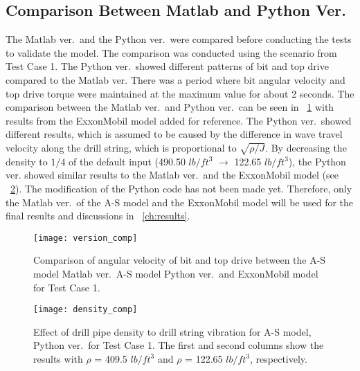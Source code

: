 \subsection{Comparison Between Matlab and Python Ver.}
The Matlab ver.\ and the Python ver.\ were compared before conducting the tests to validate the model. The comparison was conducted using the scenario from Test Case 1. The Python ver.\ showed different patterns of bit and top drive compared to the Matlab ver. There was a period where bit angular velocity and top drive torque were maintained at the maximum value for about 2 seconds. The comparison between the Matlab ver.\ and Python ver.\ can be seen in \figurename~\ref{figure_Test1_comp_chASmodel} with results from the ExxonMobil model added for reference. The Python ver.\ showed different results, which is assumed to be caused by the difference in wave travel velocity along the drill string, which is proportional to $\sqrt{\rho/J}$. By decreasing the density to $1/4$ of the default input (490.50 $lb/ft^3$ $\rightarrow$ 122.65 $lb/ft^3$), the Python ver. showed similar results to the Matlab ver.\ and the ExxonMobil model (see \figurename~\ref{figure_Python_reducedDensity}). The modification of the Python code has not been made yet. Therefore, only the Matlab ver.\ of the A-S model and the ExxonMobil model will be used for the final results and discussions in \chaptername~\ref{ch:results}.

\begin{figure}
  \centering
  \texttt{[image: version\_comp]}
  \caption[Comparison between different models for Test Case 1]{Comparison of angular velocity of bit and top drive between the A-S model Matlab ver.\, A-S model Python ver.\ and ExxonMobil model for Test Case 1.}\label{figure_Test1_comp_chASmodel}
\end{figure}

\begin{figure}
  \centering
  \texttt{[image: density\_comp]}
  \caption[Effect of drill pipe density in Python ver.\ for Test Case 1]{Effect of drill pipe density to drill string vibration for A-S model, Python ver.\ for Test Case 1.  The first and second columns show the results with $\rho$ = 409.5 $lb/ft^3$ and  $\rho$ = 122.65 $lb/ft^3$, respectively.}\label{figure_Python_reducedDensity}
\end{figure}


